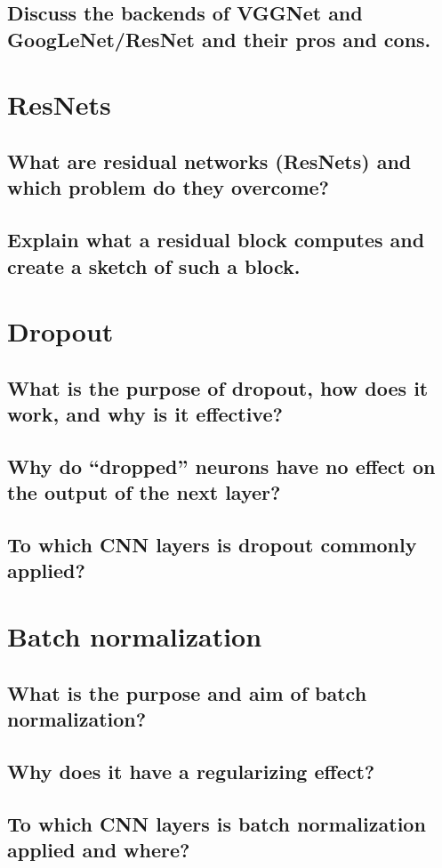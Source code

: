 \subsection{Discuss the backends of VGGNet and GoogLeNet/ResNet and their pros and cons.}

\section{ResNets}
\subsection{What are residual networks (ResNets) and which problem do they overcome?}
\subsection{Explain what a residual block computes and create a sketch of such a block.}

\section{Dropout}
\subsection{What is the purpose of dropout, how does it work, and why is it effective?}
\subsection{Why do ``dropped'' neurons have no effect on the output of the next layer?}
\subsection{To which CNN layers is dropout commonly applied?}

\section{Batch normalization}
\subsection{What is the purpose and aim of batch normalization?}
\subsection{Why does it have a regularizing effect?}
\subsection{To which CNN layers is batch normalization applied and where?}

